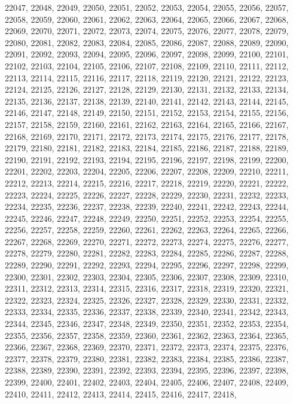 22047,
22048,
22049,
22050,
22051,
22052,
22053,
22054,
22055,
22056,
22057,
22058,
22059,
22060,
22061,
22062,
22063,
22064,
22065,
22066,
22067,
22068,
22069,
22070,
22071,
22072,
22073,
22074,
22075,
22076,
22077,
22078,
22079,
22080,
22081,
22082,
22083,
22084,
22085,
22086,
22087,
22088,
22089,
22090,
22091,
22092,
22093,
22094,
22095,
22096,
22097,
22098,
22099,
22100,
22101,
22102,
22103,
22104,
22105,
22106,
22107,
22108,
22109,
22110,
22111,
22112,
22113,
22114,
22115,
22116,
22117,
22118,
22119,
22120,
22121,
22122,
22123,
22124,
22125,
22126,
22127,
22128,
22129,
22130,
22131,
22132,
22133,
22134,
22135,
22136,
22137,
22138,
22139,
22140,
22141,
22142,
22143,
22144,
22145,
22146,
22147,
22148,
22149,
22150,
22151,
22152,
22153,
22154,
22155,
22156,
22157,
22158,
22159,
22160,
22161,
22162,
22163,
22164,
22165,
22166,
22167,
22168,
22169,
22170,
22171,
22172,
22173,
22174,
22175,
22176,
22177,
22178,
22179,
22180,
22181,
22182,
22183,
22184,
22185,
22186,
22187,
22188,
22189,
22190,
22191,
22192,
22193,
22194,
22195,
22196,
22197,
22198,
22199,
22200,
22201,
22202,
22203,
22204,
22205,
22206,
22207,
22208,
22209,
22210,
22211,
22212,
22213,
22214,
22215,
22216,
22217,
22218,
22219,
22220,
22221,
22222,
22223,
22224,
22225,
22226,
22227,
22228,
22229,
22230,
22231,
22232,
22233,
22234,
22235,
22236,
22237,
22238,
22239,
22240,
22241,
22242,
22243,
22244,
22245,
22246,
22247,
22248,
22249,
22250,
22251,
22252,
22253,
22254,
22255,
22256,
22257,
22258,
22259,
22260,
22261,
22262,
22263,
22264,
22265,
22266,
22267,
22268,
22269,
22270,
22271,
22272,
22273,
22274,
22275,
22276,
22277,
22278,
22279,
22280,
22281,
22282,
22283,
22284,
22285,
22286,
22287,
22288,
22289,
22290,
22291,
22292,
22293,
22294,
22295,
22296,
22297,
22298,
22299,
22300,
22301,
22302,
22303,
22304,
22305,
22306,
22307,
22308,
22309,
22310,
22311,
22312,
22313,
22314,
22315,
22316,
22317,
22318,
22319,
22320,
22321,
22322,
22323,
22324,
22325,
22326,
22327,
22328,
22329,
22330,
22331,
22332,
22333,
22334,
22335,
22336,
22337,
22338,
22339,
22340,
22341,
22342,
22343,
22344,
22345,
22346,
22347,
22348,
22349,
22350,
22351,
22352,
22353,
22354,
22355,
22356,
22357,
22358,
22359,
22360,
22361,
22362,
22363,
22364,
22365,
22366,
22367,
22368,
22369,
22370,
22371,
22372,
22373,
22374,
22375,
22376,
22377,
22378,
22379,
22380,
22381,
22382,
22383,
22384,
22385,
22386,
22387,
22388,
22389,
22390,
22391,
22392,
22393,
22394,
22395,
22396,
22397,
22398,
22399,
22400,
22401,
22402,
22403,
22404,
22405,
22406,
22407,
22408,
22409,
22410,
22411,
22412,
22413,
22414,
22415,
22416,
22417,
22418,
